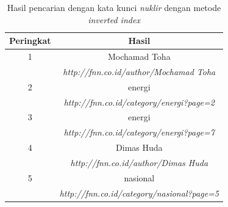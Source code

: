 
\begin{table}[H]
\begin{center}
  \caption{\label{tabel:hasil_inv_nuklir} Hasil pencarian dengan kata kunci
  \textit{nuklir} dengan metode \textit{inverted index}}
\begin{tabular}{|c|c|} 
 \hline
  Peringkat & Hasil \\ 
 \hline
  1 & Mochamad Toha \\ 
   & \textit{http://fnn.co.id/author/Mochamad Toha} \\
 \hline
  2 & energi \\
   & \textit{http://fnn.co.id/category/energi?page=2} \\
 \hline
  3 & energi \\
   & \textit{http://fnn.co.id/category/energi?page=7} \\
 \hline
  4 & Dimas Huda \\
   & \textit{http://fnn.co.id/author/Dimas Huda} \\
 \hline
  5 & nasional \\
   & \textit{http://fnn.co.id/category/nasional?page=5} \\
 \hline
\end{tabular}
\end{center}
\end{table}

